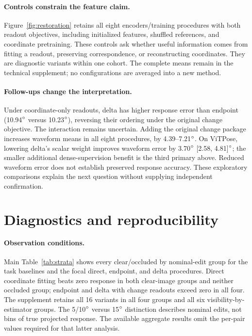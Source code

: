 \paragraph{Controls constrain the feature claim.} Figure~\ref{fig:restoration} retains all eight encoders/training procedures with both readout objectives, including initialized features, shuffled references, and coordinate pretraining. These controls ask whether useful information comes from fitting a readout, preserving correspondence, or reconstructing coordinates. They are diagnostic variants within one cohort. The complete means remain in the technical supplement; no configurations are averaged into a new method.

\paragraph{Follow-ups change the interpretation.} Under coordinate-only readouts, delta has higher response error than endpoint (10.94$^{\circ}$ versus 10.23$^{\circ}$), reversing their ordering under the original change objective. The interaction remains uncertain. Adding the original change package increases waveform means in all eight procedures, by 4.39--7.21$^{\circ}$. On ViTPose, lowering delta's scalar weight improves waveform error by 3.70$^{\circ}$ [2.58, 4.81]$^{\circ}$; the smaller additional dense-supervision benefit is the third primary above. Reduced waveform error does not establish preserved response accuracy. These exploratory comparisons explain the next question without supplying independent confirmation.

\clearpage
\section{Diagnostics and reproducibility}
\label{app:strata}
\label{app:cost}
\label{app:failures}
\label{app:repair}
\label{app:reproduction}
\label{app:journey}
\paragraph{Observation conditions.} Main Table~\ref{tab:strata} shows every clear/occluded by nominal-edit group for the task baselines and the focal direct, endpoint, and delta procedures. Direct coordinate fitting beats zero response in both clear-image groups and neither occluded group; endpoint and delta with change readouts exceed zero in all four. The supplement retains all 16 variants in all four groups and all six visibility-by-estimator groups. The 5/10$^{\circ}$ versus 15$^{\circ}$ distinction describes nominal edits, not bins of true projected response. The available aggregate results omit the per-pair values required for that latter analysis.

